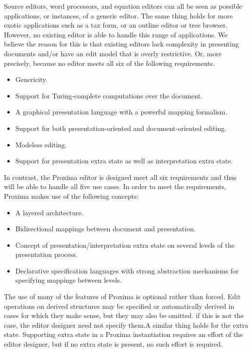 \documentclass{entcs}
\begin{document}
Source editors, word processors, and equation editors can all be seen as possible applications, or instances, of a generic editor.  The same thing holds for more exotic applications such as a tax form, or an outline editor or tree browser. However, no existing editor is able to handle this range of applications. We believe the reason for this is that existing editors lack complexity in presenting documents and/or have an edit model that is overly restrictive. Or, more precisely, because no editor meets all six of the following requirements.

\begin{itemize}
\item Genericity.
\item Support for Turing-complete computations over the document.
\item A graphical presentation language with a powerful mapping formalism.
\item Support for both presentation-oriented and document-oriented editing.
\item Modeless editing.
\item Support for presentation extra state as well as interpretation extra state.
\end{itemize}

In contrast, the Proxima editor is designed meet all six requirements and thus will be able to handle all five use cases. In order to meet the requirements, Proxima makes use of the following concepts:

\begin{itemize}
\item A layered architecture.
\item Bidirectional mappings between document and presentation.
\item Concept of presentation/interpretation extra state on several levels of the presentation process.
\item Declarative specification languages with strong abstraction mechanisms for specifying mappings between levels.
\end{itemize}

The use of many of the features of Proxima is optional rather than forced. Edit operations on derived structures may be specified or automatically derived in cases for which they make sense, but they may also be omitted. \bc if this is not the case, the editor designer need not specify them.\ec A similar thing holds for the extra state. Supporting extra state in a Proxima instantiation requires an effort of the editor designer, but if no extra state is present, no such effort is required.




\end{document}
